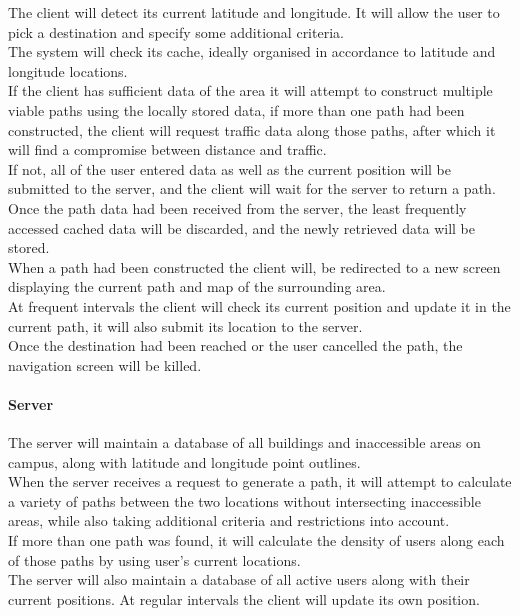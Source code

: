 \documentclass[12pt,a4paper]{article}
\begin{document}
					The client will detect its current latitude and longitude. It will allow 
					the user to pick a destination and specify some additional criteria. \\
					The system will check its cache, ideally organised in accordance to latitude 
					and longitude locations. \\
					If the client has sufficient data of the area it will attempt to construct 
					multiple viable paths using the locally stored data, if more than one path 
					had been constructed, the client will request traffic data along those paths, 
					after which it will find a compromise between distance and traffic.\\
					If not, all of the user entered data as well as the current position will 
					be submitted to the server, and the client will wait for the server to return 
					a path.\\
					Once the path data had been received from the server, the least frequently 
					accessed cached data will be discarded, and the newly retrieved data will be stored.\\
					When a path had been constructed the client will, be redirected to a new screen 
					displaying the current path and map of the surrounding area.\\
					At frequent intervals the client will check its current position and update it in the 
					current path, it will also submit its location to the server.\\
					Once the destination had been reached or the user cancelled the path, the navigation 
					screen will be killed.
					
				\paragraph{Server}
				
					The server will maintain a database of all buildings and inaccessible areas on 
					campus, along with latitude and longitude point outlines. \\
					When the server receives a request to generate a path, it will attempt to calculate 
					a variety of paths between the two locations without intersecting inaccessible areas, 
					while also taking additional criteria and restrictions into account.\\
					If more than one path was found, it will calculate the density of users along each 
					of those paths by using user's current locations.\\
					The server will also maintain a database of all active users along with their current 
					positions. At regular intervals the client will update its own position.
\end{document}
